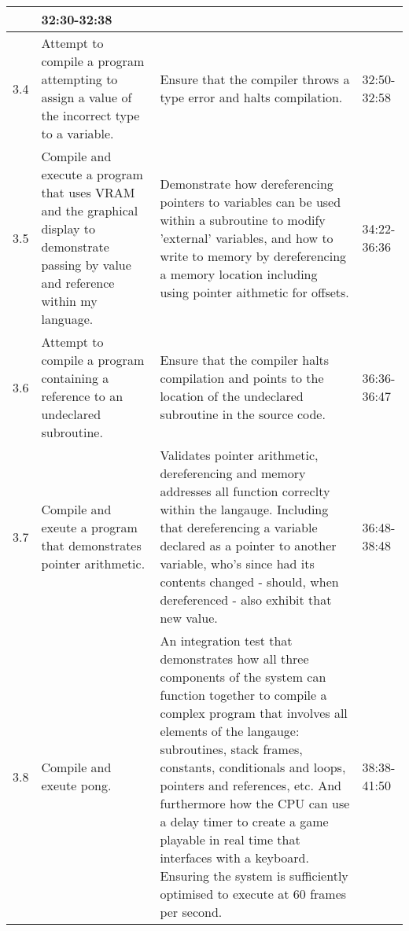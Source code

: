 \begin{longtable}{|p{1cm}|p{5cm}|p{5cm}|p{2cm}|}
        & 
        32:30-32:38
        \\
    \hline
        3.4
        & 
        Attempt to compile a program attempting to assign a value of the incorrect type to a variable.
        &
        Ensure that the compiler throws a type error and halts compilation. 
        & 
        32:50-32:58
        \\
    \hline
        3.5
        & 
        Compile and execute a program that uses VRAM and the graphical display to demonstrate passing by value and reference within my language. 
        &
        Demonstrate how dereferencing pointers to variables can be used within a subroutine to modify 'external' variables, and how to write to memory by dereferencing a memory location including using pointer aithmetic for offsets. 
        & 
        34:22-36:36
        \\
    \hline
        3.6
        & 
        Attempt to compile a program containing a reference to an undeclared subroutine.
        &
        Ensure that the compiler halts compilation and points to the location of the undeclared subroutine in the source code.
        & 
        36:36-36:47
        \\
    \hline
        3.7
        & 
        Compile and exeute a program that demonstrates pointer arithmetic. 
        &   
        Validates pointer arithmetic, dereferencing and memory addresses all function correclty within the langauge. Including that dereferencing a variable declared as a pointer to another variable, who's since had its contents changed - should, when dereferenced - also exhibit that new value. 
        & 
        36:48-38:48
        \\
    \hline
        3.8
        & 
        Compile and exeute pong. 
        &   
        An integration test that demonstrates how all three components of the system can function together to compile a complex program that involves all elements of the langauge: subroutines, stack frames, constants, conditionals and loops, pointers and references, etc. And furthermore how the CPU can use a delay timer to create a game playable in real time that interfaces with a keyboard. Ensuring the system is sufficiently optimised to execute at 60 frames per second. 
        & 
        38:38-41:50
        \\
    \hline
\end{longtable}